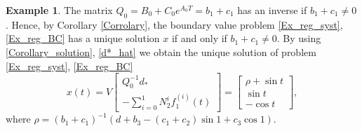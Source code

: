 \documentclass[preprint,12pt]{elsarticle}
\numberwithin{equation}{section}
\theoremstyle{definition}
\newtheorem{example}[theorem]{Example}
\begin{document}
\begin{example}
The matrix $Q_0=B_0+C_0 e^{A_0 T}=b_1+c_1$ has an inverse if $b_1+c_1\neq 0$.
Hence, by Corollary \ref{Corrolary}, the boundary value problem \eqref{Ex_reg_syst}, \eqref{Ex_reg_BC} has a unique solution $x$ if and only if $b_1+c_1\neq 0$. By using \eqref{Corollary_solution}, \eqref{d*_hat} we obtain the unique solution of problem \eqref{Ex_reg_syst}, \eqref{Ex_reg_BC}
\begin{equation*}
    x(t)=V\begin{bmatrix}
        Q_0^{-1}d_*\\-\sum\limits_{i=0}^{1}N_2^i f_1^{(i)}(t)
    \end{bmatrix}=\begin{bmatrix}
        \rho+\sin t\\\sin t\\-\cos t
    \end{bmatrix},
\end{equation*}
where $\rho=(b_1+c_1)^{-1}(d+b_3-(c_1+c_2)\sin 1 +c_3\cos 1)$.
\end{example}
\end{document}
